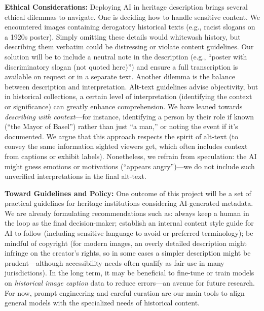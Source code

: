 \documentclass{anthology-ch}         %
\begin{document}
\textbf{Ethical Considerations:} Deploying AI in heritage description brings several ethical dilemmas to navigate. One is deciding how to handle sensitive content. We encountered images containing derogatory historical texts (e.g., racist slogans on a 1920s poster). Simply omitting these details would whitewash history, but describing them verbatim could be distressing or violate content guidelines. Our solution will be to include a neutral note in the description (e.g., ``poster with discriminatory slogan (not quoted here)'') and ensure a full transcription is available on request or in a separate text. Another dilemma is the balance between description and interpretation. Alt-text guidelines advise objectivity, but in historical collections, a certain level of interpretation (identifying the context or significance) can greatly enhance comprehension. We have leaned towards \emph{describing with context}---for instance, identifying a person by their role if known (``the Mayor of Basel'') rather than just ``a man,'' or noting the event if it’s documented. We argue that this approach respects the spirit of alt-text (to convey the same information sighted viewers get, which often includes context from captions or exhibit labels). Nonetheless, we refrain from speculation: the AI might guess emotions or motivations (``appears angry'')---we do not include such unverified interpretations in the final alt-text.

\textbf{Toward Guidelines and Policy:} One outcome of this project will be a set of practical guidelines for heritage institutions considering AI-generated metadata. We are already formulating recommendations such as: always keep a human in the loop as the final decision-maker; establish an internal content style guide for AI to follow (including sensitive language to avoid or preferred terminology); be mindful of copyright (for modern images, an overly detailed description might infringe on the creator’s rights, so in some cases a simpler description might be prudent---although accessibility needs often qualify as fair use in many jurisdictions). In the long term, it may be beneficial to fine-tune or train models on \emph{historical image caption} data to reduce errors---an avenue for future research. For now, prompt engineering and careful curation are our main tools to align general models with the specialized needs of historical content.
\end{document}
